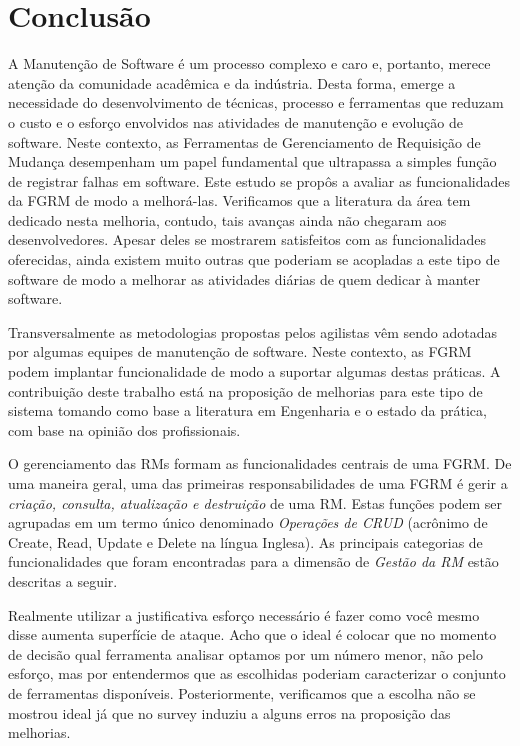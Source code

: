 \chapter{Conclusão}
\label{ch:conclusao_trab_futuros}

A Manutenção de Software é um processo complexo e caro e, portanto,  merece
atenção da comunidade acadêmica e da indústria. Desta forma, emerge a
necessidade do desenvolvimento de técnicas, processo e ferramentas que reduzam o
custo e o esforço envolvidos nas atividades de manutenção e evolução de
software. Neste contexto, as Ferramentas de Gerenciamento de Requisição de
Mudança desempenham um papel fundamental que ultrapassa a simples função de
registrar falhas em software. Este estudo se propôs a avaliar as funcionalidades
da FGRM de modo a melhorá-las. Verificamos que a literatura da área tem dedicado
nesta melhoria, contudo, tais avanças ainda não chegaram aos desenvolvedores.
Apesar deles se mostrarem satisfeitos com  as funcionalidades oferecidas, ainda
existem muito outras que poderiam se acopladas a este tipo de software de modo a
melhorar as atividades diárias de quem dedicar à manter software.

Transversalmente as metodologias propostas pelos agilistas vêm sendo adotadas
por algumas equipes de manutenção de software. Neste contexto, as FGRM podem
implantar funcionalidade de modo a suportar algumas destas práticas. A
contribuição deste trabalho está na proposição de melhorias para este tipo de
sistema tomando como base a literatura em Engenharia e o estado da prática, com
base na opinião dos profissionais.

O gerenciamento das RMs formam as funcionalidades centrais de uma FGRM\@. De uma
maneira geral, uma das primeiras responsabilidades de uma FGRM é gerir a
\textit{criação, consulta, atualização e destruição} de uma RM\@. Estas funções
podem ser agrupadas em um termo único denominado \textit{Operações de CRUD}
(acrônimo de Create, Read, Update e Delete na língua Inglesa). As principais
categorias de funcionalidades que foram encontradas para a dimensão de
\textit{Gestão da RM} estão descritas a seguir.

Realmente utilizar a justificativa esforço necessário é fazer como você mesmo
disse aumenta superfície de ataque. Acho que o ideal é colocar que no momento
de decisão qual ferramenta analisar optamos por um número menor, não pelo
esforço, mas por entendermos que as escolhidas poderiam caracterizar o conjunto
de ferramentas disponíveis. Posteriormente, verificamos que a escolha não se
mostrou ideal já que no survey induziu a alguns erros na proposição das
melhorias.
